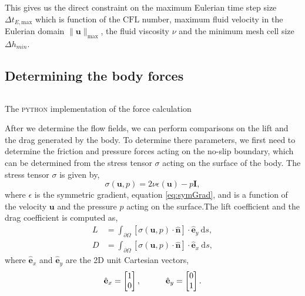 This gives us the direct constraint on the maximum Eulerian time step size $\Delta t_{E,\mathrm{max}}$ which is function of the $\mathrm{CFL}$ number, maximum fluid velocity in the Eulerian domain $\lVert \mathbf{u} \rVert_{\mathrm{max}}$, the fluid viscosity $\nu$ and the minimum mesh cell size $\Delta h_{min}$. 


\subsection{Determining the body forces}

	\begin{listing}[t]
	\inputminted[fontseries=courier,obeytabs,fontsize=\footnotesize,mathescape,linenos,numbersep=5pt,frame=lines,framesep=2mm,xleftmargin=20mm,xrightmargin=20mm]{python}{figures/eulerian/forces.py}
	\caption{The \textsc{python} implementation of the force calculation}
	\label{lst:pycode-forceCalculation}
	\end{listing}

After we determine the flow fields, we can perform comparisons on the lift and the drag generated by the body. To determine there parameters, we first need to determine the friction and pressure forces acting on the no-slip boundary, which can be determined from the stress tensor $\sigma$ acting on the surface of the body. The stress tensor $\sigma$ is given by,
	\begin{equation}
	\sigma(\mathbf{u},p) = 2\nu\epsilon(\mathbf{u}) - p\mathbf{I},
	\end{equation}
where $\epsilon$ is the symmetric gradient, equation \ref{eq:symGrad}, and is a function of the velocity $\mathbf{u}$ and the pressure $p$ acting on the surface.The lift coefficient and the drag coefficient is computed as,
	\begin{subequations}
	\begin{align}
	L &= \int_{\partial \Omega} \left[\sigma(\mathbf{u},p) \cdot \hat{\mathbf{n}}\right]\cdot \hat{\mathbf{e}}_y\ \mathrm{d}s,\\
	D &= \int_{\partial \Omega} \left[\sigma(\mathbf{u},p) \cdot \hat{\mathbf{n}}\right]\cdot \hat{\mathbf{e}}_x\ \mathrm{d}s,
	\end{align}
	\label{eq:LiftDragEq}
	\end{subequations}
where $\hat{\mathbf{e}}_x$ and $\hat{\mathbf{e}}_y$ are the 2D unit Cartesian vectors,
	\begin{equation}
	\hat{\mathbf{e}}_x = \begin{bmatrix}
	 1 \\ 
	 0 
	\end{bmatrix}, \qquad \quad 
	\hat{\mathbf{e}}_y = \begin{bmatrix}
		 0 \\ 
		 1 
		\end{bmatrix}.\\
	\end{equation}


